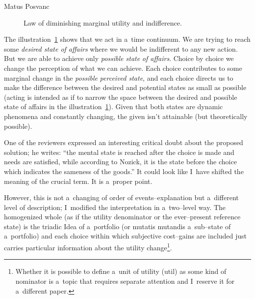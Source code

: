 \begin{artengenv}{Matus Posvanc}
\begin{figure}
 \begin{center}
 \end{center}%
 \caption{Law of diminishing marginal utility and indifference.}\label{pos:fig4}
\end{figure}






The illustration~\ref{pos:fig4} shows that we act in a~time continuum. We are trying to reach some \textit{desired state of affairs} where we would be indifferent to any new action. But we are able to achieve only \textit{possible state} \textit{of affairs}. Choice by choice we change the perception of what we can achieve. Each choice contributes to some marginal change in the \textit{possible} \textit{perceived state}, and each choice directs us to make the difference between the desired and potential states as small as possible (acting is intended as if to narrow the space between the desired and possible state of affairs in the illustration~\ref{pos:fig4}). Given that both states are dynamic phenomena and constantly changing, the given isn't attainable (but theoretically possible).



One of the reviewers expressed an interesting critical doubt about the proposed solution; he writes: ``the mental state is reached after the choice is made and needs are satisfied, while according to Nozick, it is the state before the choice which indicates the sameness of the goods.'' It could look like I~have shifted the meaning of the crucial term. It is a~proper point.



However, this is not a~changing of order of events–explanation but a~different level of description; I~modified the interpretation in a~two–level way. The homogenized whole (as if the utility denominator or the ever–present reference state) is the triadic Idea of a~portfolio (or mutatis mutandis a~sub–state of a~portfolio) and each choice within which subjective cost–gains are included just carries particular information about the utility change\footnote{Whether it is possible to define a~unit of utility (util) as some kind of nominator is a~topic that requires separate attention and I~reserve it for a~different paper. }.




\end{artengenv}
